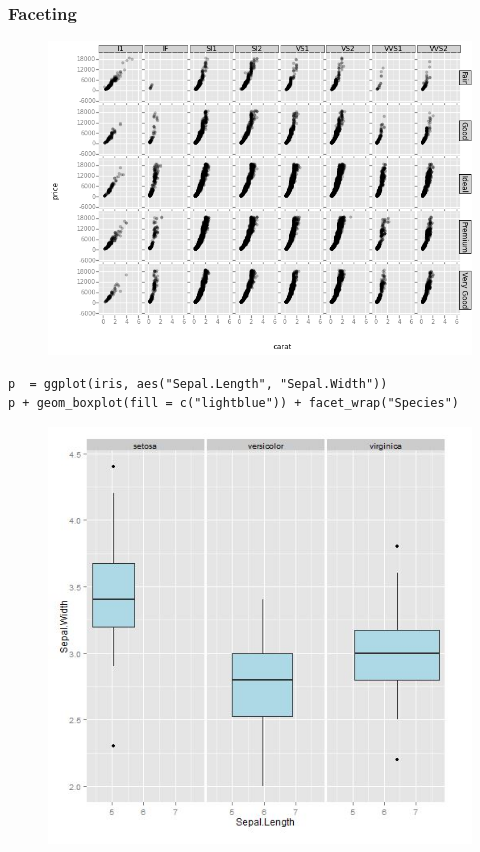 \documentclass{beamer}
\begin{document}
\begin{frame}
\frametitle{Faceting}
	\begin{figure}
\centering
\includegraphics[width=0.99\linewidth]{Facet4}
\end{figure}

\end{frame}
\begin{frame}[fragile]
	\begin{framed}
	\begin{verbatim}
p  = ggplot(iris, aes("Sepal.Length", "Sepal.Width"))
p + geom_boxplot(fill = c("lightblue")) + facet_wrap("Species")

	\end{verbatim}
		
	\end{framed}
\end{frame}



\begin{frame}
	\begin{figure}
		\centering
		\includegraphics[width=0.7\linewidth]{iris-boxplot}
		\caption{}
		\label{fig:iris-boxplot}
	\end{figure}
	
\end{frame}
\end{document}

